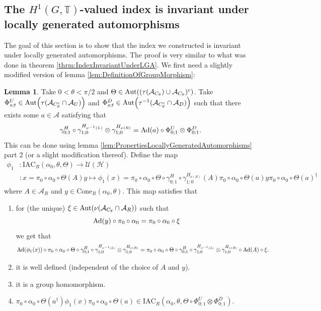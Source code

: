\documentclass[12pt,a4paper,twoside]{article}
\newcommand{\IAC}{\textrm{IAC}}
\let\originalleft\left
\let\originalright\right
\renewcommand{\left}{\mathopen{}\mathclose\bgroup\originalleft}
\renewcommand{\right}{\aftergroup\egroup\originalright}
\newcommand{\UU}{\mathcal U}
\newcommand{\HH}{\mathcal H}
\newcommand{\TT}{\mathbb T}
\renewcommand{\AA}{\mathcal A}
\newcommand{\Ad}[1]{\textrm{Ad}\left(#1\right)}
\newcommand{\Aut}[1]{\textrm{Aut}\left(#1\right)}
\theoremstyle{definition}
\newtheorem{lemma}[theorem]{Lemma}
\numberwithin{equation}{section}
\begin{document}
\subsection{The $H^1(G,\TT)$-valued index is invariant under locally generated automorphisms}
The goal of this section is to show that the index we constructed is invariant under locally generated automorphisms. The proof is very similar to what was done in theorem \ref{thrm:IndexInvariantUnderLGA}. We first need a slightly modified version of lemma \ref{lem:DefinitionOfGroupMorphism}:
\begin{lemma}\label{lem:DefinitionOfGroupMorphismTwoTranslations}
	Take $0<\theta<\pi/2$ and $\Theta\in \Aut{(\tau(\AA_{C_\theta})\cup\AA_{C_\theta})^c}$. Take $\Phi^U_{s;t}\in\Aut{\tau(\AA_{C_\theta^c}\cap\AA_{U})}$ and $\Phi^D_{s;t}\in\Aut{\tau^{-1}(\AA_{C_\theta^c}\cap\AA_{D})}$ such that there exists some $a\in\AA$ satisfying that
	\begin{equation}\label{eq:DefinitionOfGroupMorphismHAutEquationTwoTranslations}
		\gamma^H_{0;1}\circ\gamma^{H_{\nu^{-1}(L)}}_{1;0}\otimes\gamma^{H_{\nu(R)}}_{1;0}=\Ad{a}\circ \Phi^U_{0;1}\otimes\Phi^D_{0;1}.
	\end{equation}
	This can be done using lemma \ref{lem:PropertiesLocallyGeneratedAutomorphisms} part 2 (or a slight modification thereof). Define the map
	\begin{align}
		\phi_1&:\IAC_{R}(\alpha_0,\theta,\Theta) \rightarrow \UU(\HH)\\
		\nonumber
		&:x=\pi_0\circ\alpha_0\circ\Theta(A)y\mapsto \phi_1(x)=\pi_0\circ\alpha_0\circ\Theta\circ\gamma^H_{0;1}\circ\gamma^{H_{\nu(R)}}_{1;0}(A)\pi_0\circ\alpha_0\circ\Theta(a)y\pi_0\circ\alpha_0\circ\Theta(a)^\dagger
	\end{align}
	where $A\in\AA_{R}$ and $y\in\textrm{Cone}_{R}(\alpha_0,\theta)$. This map satisfies that
	\begin{enumerate}
		\item  for (the unique) $\xi\in\Aut{\nu(\AA_{C_\theta}\cap\AA_R)}$ such that
		\begin{equation}
			\Ad{y}\circ\pi_0\circ\alpha_0=\pi_0\circ\alpha_0\circ\xi
		\end{equation}
		we get that
		\begin{equation}\label{eq:ConditionDefinitionOfGroupMorphismTwoTranslations}
			\Ad{\phi_1(x)}\circ\pi_0\circ\alpha_0\circ\Theta\circ\gamma^H_{0;1}\circ\gamma^{H_{\nu^{-1}(L)}}_{1;0}\otimes\gamma^{H_{\nu(R)}}_{1;0}=\pi_0\circ\alpha_0\circ\Theta\circ\gamma^H_{0;1}\circ\gamma^{H_{\nu^{-1}(L)}}_{1;0}\otimes\gamma^{H_{\nu(R)}}_{1;0}\circ\Ad{A}\circ\xi.
		\end{equation}
		\item it is well defined (independent of the choice of $A$ and $y$).
		\item it is a group homomorphism.
		\item $\pi_0\circ\alpha_0\circ\Theta(a^\dagger)\phi_1(x)\pi_0\circ\alpha_0\circ\Theta(a)\in\IAC_R(\alpha_0,\theta,\Theta\circ \Phi^U_{0;1}\otimes\Phi^D_{0;1})$.
	\end{enumerate}
\end{lemma}
\end{document}
